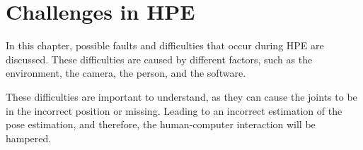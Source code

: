 \section{Challenges in HPE}
\label{sec:errors}

In this chapter, possible faults and difficulties that occur during HPE are discussed. These difficulties are caused by different factors, such as the environment, the camera, the person, and the software. 

These difficulties are important to understand, as they can cause the joints to be in the incorrect position or missing. Leading to an incorrect estimation of the pose estimation, and therefore, the human-computer interaction will be hampered.



